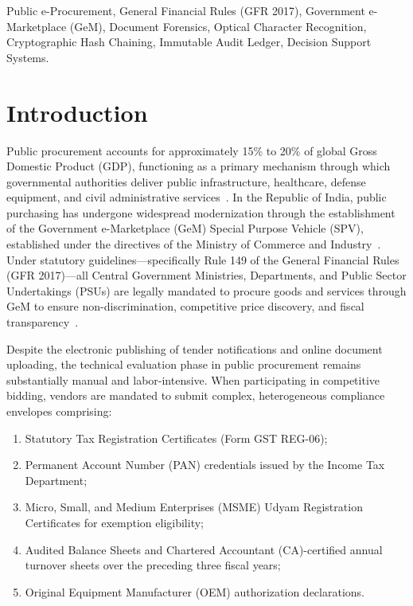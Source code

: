 \documentclass[conference]{IEEEtran}
\begin{document}
\begin{IEEEkeywords}
Public e-Procurement, General Financial Rules (GFR 2017), Government e-Marketplace (GeM), Document Forensics, Optical Character Recognition, Cryptographic Hash Chaining, Immutable Audit Ledger, Decision Support Systems.
\end{IEEEkeywords}

\section{Introduction}
Public procurement accounts for approximately 15\% to 20\% of global Gross Domestic Product (GDP), functioning as a primary mechanism through which governmental authorities deliver public infrastructure, healthcare, defense equipment, and civil administrative services~\cite{worldbank2017}. In the Republic of India, public purchasing has undergone widespread modernization through the establishment of the Government e-Marketplace (GeM) Special Purpose Vehicle (SPV), established under the directives of the Ministry of Commerce and Industry~\cite{gem2022}. Under statutory guidelines—specifically Rule 149 of the General Financial Rules (GFR 2017)—all Central Government Ministries, Departments, and Public Sector Undertakings (PSUs) are legally mandated to procure goods and services through GeM to ensure non-discrimination, competitive price discovery, and fiscal transparency~\cite{gfr2017}.

Despite the electronic publishing of tender notifications and online document uploading, the technical evaluation phase in public procurement remains substantially manual and labor-intensive. When participating in competitive bidding, vendors are mandated to submit complex, heterogeneous compliance envelopes comprising:
\begin{enumerate}
    \item Statutory Tax Registration Certificates (Form GST REG-06);
    \item Permanent Account Number (PAN) credentials issued by the Income Tax Department;
    \item Micro, Small, and Medium Enterprises (MSME) Udyam Registration Certificates for exemption eligibility;
    \item Audited Balance Sheets and Chartered Accountant (CA)-certified annual turnover sheets over the preceding three fiscal years;
    \item Original Equipment Manufacturer (OEM) authorization declarations.
\end{enumerate}
\end{document}
